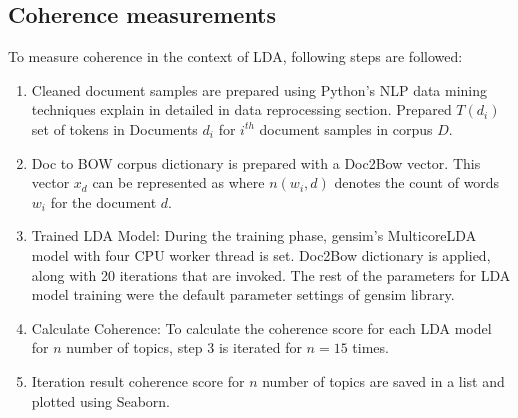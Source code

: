 \documentclass[sn-mathphys,Numbered]{sn-jnl}%
\theoremstyle{thmstyleone}%
\theoremstyle{thmstyletwo}%
\theoremstyle{thmstylethree}%
\begin{document}
\subsection{Coherence measurements}\label{coh_measure} To measure coherence in the context of LDA, following steps are followed: 

\begin{enumerate}[label=(\roman*)] 
\item Cleaned document samples are prepared using Python's NLP data mining techniques explain in detailed in data reprocessing section. Prepared \(T\left( d_{i} \right)\) set of tokens in Documents \(d_{i}\) for \(i^{th}\) document samples in corpus \(D\). 
\item Doc to BOW corpus dictionary is prepared with a Doc2Bow vector. This vector \(x_{d}\) can be represented as where \(n\left( w_{i},d \right)\) denotes the count of words \(w_{i}\) for the document \(d\). 
\item Trained LDA Model: During the training phase, gensim's MulticoreLDA model with four CPU worker thread is set. Doc2Bow dictionary is applied, along with 20 iterations that are invoked. The rest of the parameters for LDA model training were the default parameter settings of gensim library. 
\item Calculate Coherence: To calculate the coherence score for each LDA model for \(n\) number of topics, step 3 is iterated for \(n = 15\) times. 
\item Iteration result coherence score for \(n\) number of topics are saved in a list and plotted using Seaborn. 
\end{enumerate} 
\end{document}
